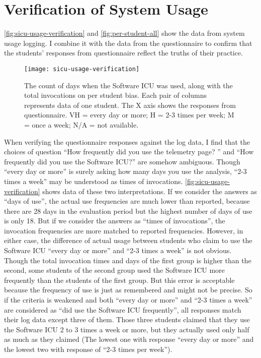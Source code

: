 \section {Verification of System Usage}

\autoref{fig:sicu-usage-verification} and \autoref{fig:per-student-all} show the data from system usage logging. I combine it with the data from the questionnaire to confirm that the students' responses from questionnaire reflect the truths of their practice. 

\begin{figure}[htbp] %
   \centering
   \texttt{[image: sicu-usage-verification]} 
   \caption[SICU usage on per student bias]{The count of days when the Software ICU was used, along with the total invocations on per student bias. Each pair of columns represents data of one student. The X axis shows the responses from questionnaire. VH = every day or more; H = 2-3 times per week; M = once a week; N/A = not available.}
   \label{fig:sicu-usage-verification}
\end{figure}

When verifying the questionnaire responses against the log data, I find that the choices of question ``How frequently did you use the telemetry page? '' and ``How frequently did you use the Software ICU?'' are somehow ambiguous. Though ``every day or more'' is surely asking how many days you use the analysis, ``2-3 times a week'' may be understood as times of invocations. \autoref{fig:sicu-usage-verification} shows data of these two interpretations. If we consider the answers as ``days of use'', the actual use frequencies are much lower than reported, because there are 28 days in the evaluation period but the highest number of days of use is only 18. But if we consider the answers as ``times of invocations'', the invocation frequencies are more matched to reported frequencies. However, in either case, the difference of actual usage between students who claim to use the Software ICU ``every day or more'' and ``2-3 times a week'' is not obvious. Though the total invocation times and days of the first group is higher than the second, some students of the second group used the Software ICU more frequently than the students of the first group. But this error is acceptable because the frequency of use is just as remembered and might not be precise. So if the criteria is weakened and both ``every day or more'' and ``2-3 times a week'' are considered as ``did use the Software ICU frequently'', all responses match their log data except three of them. Those three students claimed that they use the Software ICU 2 to 3 times a week or more, but they actually used only half as much as they claimed (The lowest one with response ``every day or more'' and the lowest two with response of ``2-3 times per week'').

